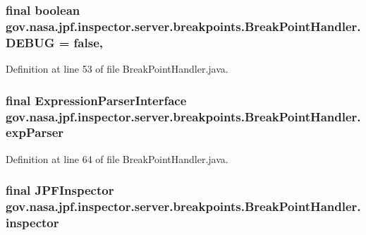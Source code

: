 \subsubsection[{\texorpdfstring{D\+E\+B\+UG}{DEBUG}}]{\setlength{\rightskip}{0pt plus 5cm}final boolean gov.\+nasa.\+jpf.\+inspector.\+server.\+breakpoints.\+Break\+Point\+Handler.\+D\+E\+B\+UG = false\hspace{0.3cm}{\ttfamily [static]}, {\ttfamily [private]}}\hypertarget{classgov_1_1nasa_1_1jpf_1_1inspector_1_1server_1_1breakpoints_1_1_break_point_handler_ad5be764c1733da754d5f2f4b62bf4961}{}\label{classgov_1_1nasa_1_1jpf_1_1inspector_1_1server_1_1breakpoints_1_1_break_point_handler_ad5be764c1733da754d5f2f4b62bf4961}


Definition at line 53 of file Break\+Point\+Handler.\+java.

\subsubsection[{\texorpdfstring{exp\+Parser}{expParser}}]{\setlength{\rightskip}{0pt plus 5cm}final {\bf Expression\+Parser\+Interface} gov.\+nasa.\+jpf.\+inspector.\+server.\+breakpoints.\+Break\+Point\+Handler.\+exp\+Parser\hspace{0.3cm}{\ttfamily [private]}}\hypertarget{classgov_1_1nasa_1_1jpf_1_1inspector_1_1server_1_1breakpoints_1_1_break_point_handler_a2e53a189babb994c66b8f09315243934}{}\label{classgov_1_1nasa_1_1jpf_1_1inspector_1_1server_1_1breakpoints_1_1_break_point_handler_a2e53a189babb994c66b8f09315243934}


Definition at line 64 of file Break\+Point\+Handler.\+java.

\subsubsection[{\texorpdfstring{inspector}{inspector}}]{\setlength{\rightskip}{0pt plus 5cm}final {\bf J\+P\+F\+Inspector} gov.\+nasa.\+jpf.\+inspector.\+server.\+breakpoints.\+Break\+Point\+Handler.\+inspector\hspace{0.3cm}{\ttfamily [protected]}}\hypertarget{classgov_1_1nasa_1_1jpf_1_1inspector_1_1server_1_1breakpoints_1_1_break_point_handler_a92e4bc8adfb985ae4efeef9bd96ee9e9}{}\label{classgov_1_1nasa_1_1jpf_1_1inspector_1_1server_1_1breakpoints_1_1_break_point_handler_a92e4bc8adfb985ae4efeef9bd96ee9e9}



